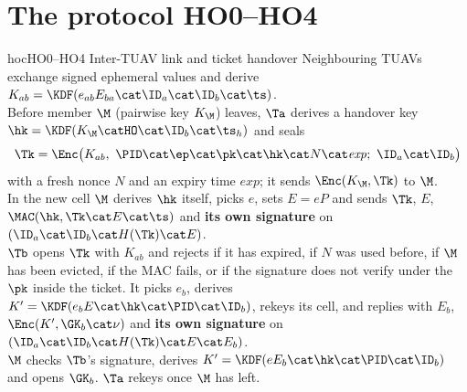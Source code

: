 \section{The protocol HO0--HO4}
\begin{stepbox}{hoc}{HO0--HO4 \;Inter-TUAV link and ticket handover}
 Neighbouring TUAVs exchange signed ephemeral values and derive $K_{ab}=\KDF(e_{ab}E_{ba}\cat\ID_a\cat\ID_b\cat\ts)$.\\[2pt]
 Before member $\M$ (pairwise key $K_\M$) leaves, $\Ta$ derives a handover key $\hk=\KDF(K_\M\cat\texttt{HO}\cat\ID_b\cat\ts_h)$ and seals
\[
\Tk=\Enc\big(K_{ab},\ \PID\cat\ep\cat\pk\cat\hk\cat N\cat\mathit{exp};\ \ID_a\cat\ID_b\big)
\]
with a fresh nonce $N$ and an expiry time $\mathit{exp}$; it sends $\Enc(K_\M,\Tk)$ to $\M$.\\[2pt]
 In the new cell $\M$ derives $\hk$ itself, picks $e$, sets $E=eP$ and sends
$\Tk$, $E$, $\MAC(\hk,\Tk\cat E\cat\ts)$ and \textbf{its own signature} on $(\ID_a\cat\ID_b\cat H(\Tk)\cat E)$.\\[2pt]
 $\Tb$ opens $\Tk$ with $K_{ab}$ and rejects if it has expired, if $N$ was used before, if $\M$ has been evicted, if the MAC fails, or if the
signature does not verify under the $\pk$ inside the ticket. It picks $e_b$, derives $K'=\KDF(e_bE\cat\hk\cat\PID\cat\ID_b)$, rekeys its cell, and replies
with $E_b$, $\Enc(K',\GK_b\cat\nu)$ and \textbf{its own signature} on $(\ID_a\cat\ID_b\cat H(\Tk)\cat E\cat E_b)$.\\[2pt]
 $\M$ checks $\Tb$'s signature, derives $K'=\KDF(eE_b\cat\hk\cat\PID\cat\ID_b)$ and opens $\GK_b$. $\Ta$ rekeys once $\M$ has left.
\end{stepbox}

